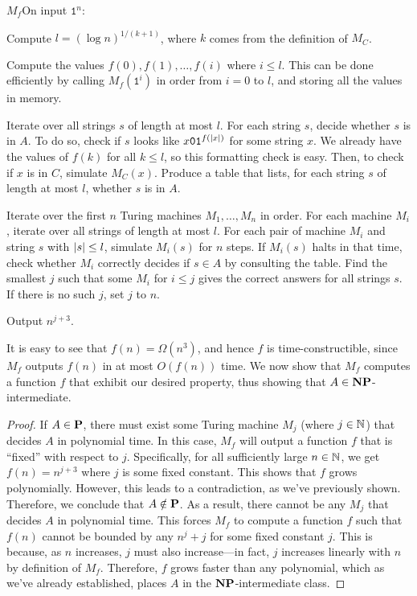 \begin{turing}{$M_f$}{On input $\texttt{1}^n$:}
\item Compute $l = (\log n)^{1 / (k + 1)}$, where $k$ comes from the definition of $M_C$.
\item Compute the values $f(0), f(1), \dots, f(i)$ where $i \leq l$. This can be done efficiently by calling $M_f(\texttt{1}^i)$ in order from $i = 0$ to $l$, and storing all the values in memory.
\item Iterate over all strings $s$ of length at most $l$. For each string $s$, decide whether $s$ is in $A$. To do so, check if $s$ looks like $x\texttt{0}\texttt{1}^{f(| x |)}$ for some string $x$. We already have the values of $f(k)$ for all $k \leq l$, so this formatting check is easy. Then, to check if $x$ is in $C$, simulate $M_C(x)$. Produce a table that lists, for each string $s$ of length at most $l$, whether $s$ is in $A$.
\item Iterate over the first $n$ Turing machines $M_1, \dots, M_n$ in order. For each machine $M_i$, iterate over all strings of length at most $l$. For each pair of machine $M_i$ and string $s$ with $| s | \leq l$, simulate $M_i(s)$ for $n$ steps. If $M_i(s)$ halts in that time, check whether $M_i$ correctly decides if $s \in A$ by consulting the table. Find the smallest $j$ such that some $M_i$ for $i \leq j$ gives the correct answers for all strings $s$. If there is no such $j$, set $j$ to $n$.
\item Output $n^{j + 3}$.
\end{turing}

It is easy to see that $f(n) = \Omega(n^3)$, and hence $f$ is time-constructible, since $M_f$ outputs $f(n)$ in at most $O(f(n))$ time. We now show that $M_f$ computes a function $f$ that exhibit our desired property, thus showing that $A \in \textbf{NP}$-intermediate.

\begin{proof}
  If $A \in \textbf{P}$, there must exist some Turing machine $M_j$ (where $j \in \mathbb N$) that decides $A$ in polynomial time. In this case, $M_f$ will output a function $f$ that is ``fixed'' with respect to $j$. Specifically, for all sufficiently large $n \in \mathbb N$, we get $f(n) = n^{j + 3}$ where $j$ is some fixed constant. This shows that $f$ grows polynomially. However, this leads to a contradiction, as we've previously shown. Therefore, we conclude that $A \notin \textbf{P}$. As a result, there cannot be any $M_j$ that decides $A$ in polynomial time. This forces $M_f$ to compute a function $f$ such that $f(n)$ cannot be bounded by any $n^j + j$ for some fixed constant $j$. This is because, as $n$ increases, $j$ must also increase—in fact, $j$ increases linearly with $n$ by definition of $M_f$. Therefore, $f$ grows faster than any polynomial, which as we've already established, places $A$ in the $\textbf{NP}$-intermediate class.
\end{proof}

